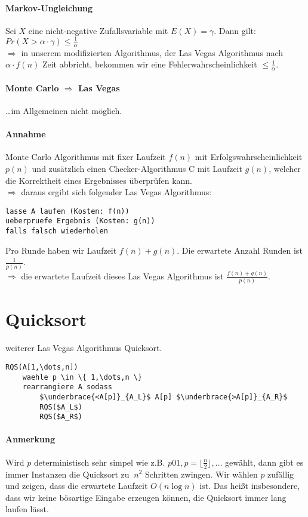 \paragraph*{Markov-Ungleichung} Sei $X$ eine nicht-negative Zufallsvariable mit $E(X) = \gamma$.
Dann gilt: $Pr(X > \alpha \cdot \gamma) \leq \frac{1}{\alpha}$ \\
$\Rightarrow$ in unserem modifizierten Algorithmus, der Las Vegas Algorithmus nach $\alpha \cdot f(n)$ Zeit abbricht, bekommen wir eine Fehlerwahrscheinlichkeit $\leq \frac{1}{\alpha}$.

\paragraph*{Monte Carlo $\Rightarrow$ Las Vegas} \dots im Allgemeinen nicht möglich.
\paragraph*{Annahme} Monte Carlo Algorithmus mit fixer Laufzeit $f(n)$ mit Erfolgswahrscheinlichkeit $p(n)$ und zusätzlich einen Checker-Algorithmus C mit Laufzeit $g(n)$, welcher die Korrektheit eines Ergebnisses überprüfen kann. \\
$\Rightarrow$ daraus ergibt sich folgender Las Vegas Algorithmus:
\begin{lstlisting}
lasse A laufen (Kosten: f(n))
ueberpruefe Ergebnis (Kosten: g(n))
falls falsch wiederholen
\end{lstlisting}

Pro Runde haben wir Laufzeit $f(n)+g(n)$. Die erwartete Anzahl Runden ist $\frac{1}{p(n)}$. \\
$\Rightarrow$ die erwartete Laufzeit dieses Las Vegas Algorithmus ist $\frac{f(n)+g(n)}{p(n)}$.

\section{Quicksort}
weiterer Las Vegas Algorithmus Quicksort.
\begin{lstlisting}[mathescape]
RQS(A[1,\dots,n])
	waehle p \in \{ 1,\dots,n \}
	rearrangiere A sodass
		$\underbrace{<A[p]}_{A_L}$ A[p] $\underbrace{>A[p]}_{A_R}$
		RQS($A_L$)
		RQS($A_R$)
\end{lstlisting}

\paragraph*{Anmerkung} Wird $p$ deterministisch sehr simpel wie z.B. $p01,p=\lfloor\frac{n}{2}\rfloor,\dots$ gewählt, dann gibt es immer Instanzen die Quicksort zu $~n^2$ Schritten zwingen.
Wir wählen $p$ zufällig und zeigen, dass die erwartete Laufzeit $O(n \log n)$ ist. Das heißt insbesondere, dass wir keine bösartige Eingabe erzeugen können, die Quicksort immer lang laufen lässt.